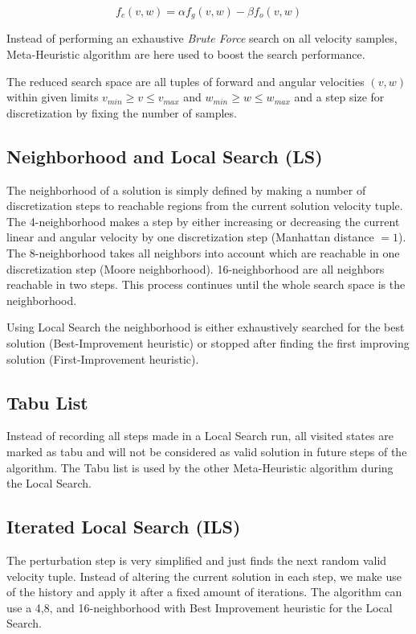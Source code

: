 \begin{equation}
   f_c(v,w)=\alpha f_g(v,w) - \beta f_o(v,w)
   \label{eq:simplecost}
\end{equation}

Instead of performing an exhaustive \textit{Brute Force} search on all velocity samples, Meta-Heuristic algorithm are here used to boost the search performance. 

The reduced search space are all tuples of forward and angular velocities $(v,w)$ within given limits $v_{min} \geq v \leq v_{max}$ and $w_{min} \geq w \leq w_{max}$ and a step size for discretization by fixing the number of samples.

\subsection{Neighborhood and Local Search (LS)}
The neighborhood of a solution is simply defined by making a number of discretization steps to reachable regions from the current solution velocity tuple. 
The 4-neighborhood makes a step by either increasing or decreasing the current linear and angular velocity by one discretization step (Manhattan distance $=1$). 
The 8-neighborhood takes all neighbors into account which are reachable in one discretization step (Moore neighborhood). 
16-neighborhood are all neighbors reachable in two steps. 
This process continues until the whole search space is the neighborhood. 

Using Local Search the neighborhood is either exhaustively searched for the best solution (Best-Improvement heuristic) or stopped after finding the first improving solution (First-Improvement heuristic).

\subsection{Tabu List}
Instead of recording all steps made in a Local Search run, all visited states are marked as tabu and will not be considered as valid solution in future steps of the algorithm. 
The Tabu list is used by the other Meta-Heuristic algorithm during the Local Search.

\subsection{Iterated Local Search (ILS)}
The perturbation step is very simplified and just finds the next random valid velocity tuple. 
Instead of altering the current solution in each step, we make use of the history and apply it after a fixed amount of iterations. 
The algorithm can use a 4,8, and 16-neighborhood with Best Improvement heuristic for the Local Search.

